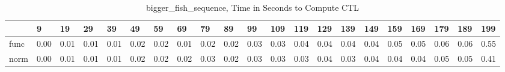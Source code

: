 \begin{table}
\centering
\caption{bigger_fish_sequence, Time in Seconds to Compute CTL}
\label{bigger_fish_sequence_CTL_time}
\begin{tabular}{lllllllllllllllllllll}
\toprule
{} &     9 &    19 &    29 &    39 &    49 &    59 &    69 &    79 &    89 &    99 &   109 &   119 &   129 &   139 &   149 &   159 &   169 &   179 &   189 &   199 \\
\midrule
func &  0.00 &  0.01 &  0.01 &  0.01 &  0.02 &  0.02 &  0.01 &  0.02 &  0.02 &  0.03 &  0.03 &  0.04 &  0.04 &  0.04 &  0.04 &  0.05 &  0.05 &  0.06 &  0.06 &  0.55 \\
norm &  0.00 &  0.01 &  0.01 &  0.01 &  0.02 &  0.02 &  0.02 &  0.03 &  0.02 &  0.03 &  0.03 &  0.03 &  0.04 &  0.03 &  0.04 &  0.04 &  0.04 &  0.05 &  0.05 &  0.41 \\
\bottomrule
\end{tabular}
\end{table}
